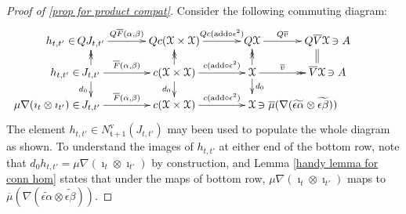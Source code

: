 \documentclass[11pt]{amsart} \renewcommand{\baselinestretch}{1.4}
\theoremstyle{plain}
\theoremstyle{definition}
\newcommand{\scrC}{\mathscr{C}}
\newcommand{\frakt}{\mathfrak{t}}
\newcommand{\calx}{\mathcal{X}}
\newcommand{\algs}{{\scrC\!\textit{om}}}
\newcommand{\uver}{^\mathrm{v}}
\begin{document}
\begin{Operations on the Bousfield-Kan spectral sequence}
\begin{proof}[Proof of \ref{prop for product compat}]
Consider
the following commuting diagram:
\[\xymatrix@R=4mm@C=12mm{
\makebox[0cm][r]{$h_{t,t'}\in\,$}QJ_{t,t'}\ar[r]^-{Q\overline{F}(\alpha,\beta)}
&%
Qc(\calx \times\calx )\ar[r]^-{Qc(\textup{add}\circ\epsilon^2)}
&%
Q\calx \ar[r]^-{Q\overline{v}}
&%
Q\overline{V}\calx \makebox[0cm][l]{$\,\ni A$}\\%
\makebox[0cm][r]{$h_{t,t'}\in\,$}
J_{t,t'}\ar[r]^-{\overline{F}(\alpha,\beta)}
\ar@{->>}[u]
\ar[d]_-{d_0}
&%
c(\calx \times \calx )\ar[r]^-{c(\textup{add}\circ\epsilon^2)}
\ar@{->>}[u]
\ar[d]_-{d_0}
&%
\calx \ar@{->>}[r]^-{\overline{v}}
\ar@{->>}[u]
\ar[d]^-{d_0}
&%
\overline{V}\calx \makebox[0cm][l]{$\,\ni A$}\ar@{=}[u]
\\%
\makebox[0cm][r]{$\mu\nabla(\imath_t\otimes\imath_{t'})\in\,$}J_{t,t'}\ar[r]^-{\overline{F}(\alpha,\beta)}
&%
c(\calx \times \calx )\ar[r]^-{c(\textup{add}\circ\epsilon^2)}
&%
\calx \makebox[0cm][l]{$\,\ni\overline{\mu}(\nabla(\widetilde{\epsilon\alpha} \otimes\widetilde{\epsilon\beta}))$}
&%
}\]
The element $h_{t,t'}\in N\uver_{\frakt+1}(J_{t,t'})$ may been used to populate the whole diagram as shown. To understand the images of $h_{t,t'}$ at either end of the bottom row, note that $d_0h_{t,t'}=\mu\nabla(\imath_t\otimes \imath_{t'})$ by construction, and Lemma \ref{handy lemma for conn hom} states that under the maps of bottom row, $\mu\nabla(\imath_t\otimes \imath_{t'})$ maps to $\overline{\mu}(\nabla(\widetilde{\epsilon\alpha} \otimes\widetilde{\epsilon\beta}))$.


\end{proof}
\end{Operations on the Bousfield-Kan spectral sequence}
\end{document}
